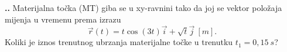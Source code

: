 
\noindent 
\textbf{
\thecjelina.\thezadatak.}
Materijalna točka (MT)  giba se u xy-ravnini tako da joj se vektor položaja mijenja u vremenu prema izrazu
$$
\vec{r}(t)=t\cos{(3t)}\vec{i}+\sqrt{t}\vec{j}\ [m].
$$
Koliki je iznos trenutnog ubrzanja materijalne točke u trenutku $t_1=0,15\ s$?

